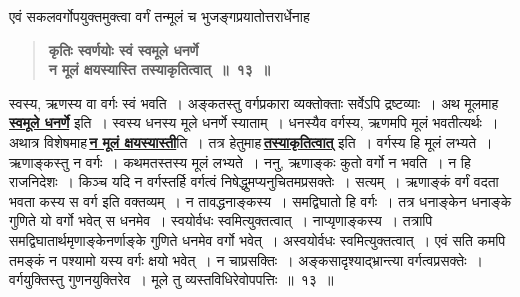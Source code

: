 \documentclass[11pt, openany]{book}
\begin{document}
\begin{sloppypar}
{\small एवं सकलवर्गोपयुक्तमुक्त्वा वर्गं तन्मूलं च भुजङ्गप्रयातोत्तरार्धेनाह\textendash }

 \label{1.13}
\begin{quote}
{\large \textbf{{\color{purple}कृतिः स्वर्णयोः स्वं स्वमूले धनर्णे \\
न मूलं क्षयस्यास्ति तस्याकृतित्वात्~॥~१३~॥}}}
\end{quote}

स्वस्य, ऋणस्य वा वर्गः स्वं भवति~। अङ्कतस्तु वर्गप्रकारा व्यक्तोक्ताः सर्वेऽपि द्रष्टव्याः~। अथ मूलमाह\textendash \,\hyperref[1.13]{\textbf{स्वमूले धनर्णे}} इति~। स्वस्य धनस्य मूले धनर्णे स्याताम्~। धनस्यैव वर्गस्य, ऋणमपि मूलं भवतीत्यर्थः~। अथात्र विशेषमाह\textendash \,\hyperref[1.13]{\textbf{न मूलं क्षयस्यास्ती}}ति~। तत्र हेतुमाह\textendash \,\hyperref[1.13]{\textbf{तस्याकृतित्वात्}} इति~। वर्गस्य हि मूलं लभ्यते~। ऋणाङ्कस्तु न वर्गः~। कथमतस्तस्य मूलं लभ्यते~। ननु, ऋणाङ्कः कुतो वर्गो न भवति~। न हि राजनिदेशः~। किञ्च यदि न वर्गस्तर्हि वर्गत्वं निषेद्धुमप्यनुचितमप्रसक्तेः~। सत्यम्~। ऋणाङ्कं वर्गं वदता भवता कस्य स वर्ग इति वक्तव्यम्~। न तावद्धनाङ्कस्य~। समद्विघातो हि वर्गः~। तत्र धनाङ्केन धनाङ्के गुणिते यो वर्गो भवेत् स धनमेव~। स्वयोर्वधः स्वमित्युक्तत्वात्~। नाप्यृणाङ्कस्य~। तत्रापि समद्विघातार्थमृणाङ्केनर्णाङ्के गुणिते धनमेव वर्गो भवेत्~। अस्वयोर्वधः स्वमित्युक्तत्वात्~। एवं सति कमपि तमङ्कं न पश्यामो यस्य वर्गः क्षयो भवेत्~। न चाप्रसक्तिः~। अङ्कसादृश्याद्भ्रान्त्या वर्गत्वप्रसक्तेः~। वर्गयुक्तिस्तु गुणनयुक्तिरेव~। मूले तु व्यस्तविधिरेवोपपत्तिः~॥~१३~॥
\end{sloppypar}

\newpage
\end{document}
